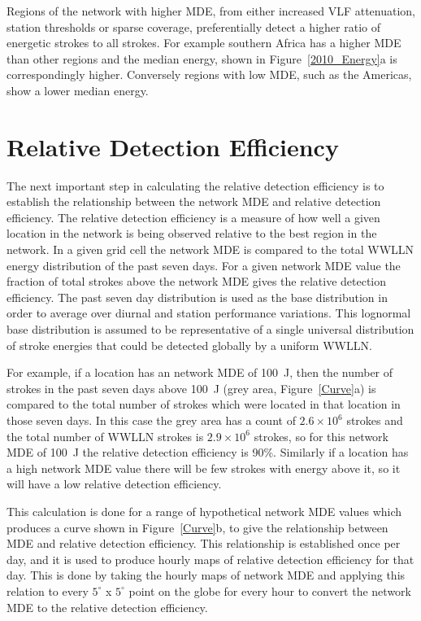 \documentclass[draft,ras]{agutex}
\begin{document}
\begin{article}
Regions of the network with higher MDE, from either increased VLF attenuation, station thresholds or sparse coverage, preferentially detect a higher ratio of energetic strokes to all strokes. For example southern Africa has a higher MDE than other regions and the median energy, shown in Figure~\ref{2010_Energy}a is correspondingly higher. Conversely regions with low MDE, such as the Americas, show a lower median energy.

\section{Relative Detection Efficiency}

The next important step in calculating the relative detection efficiency is to establish the relationship between the network MDE and relative detection efficiency. The relative detection efficiency is a measure of how well a given location in the network is being observed relative to the best region in the network. In a given grid cell the network MDE is compared to the total WWLLN energy distribution of the past seven days. For a given network MDE value the fraction of total strokes above the network MDE gives the relative detection efficiency. The past seven day distribution is used as the base distribution in order to average over diurnal and station performance variations. This lognormal base distribution is assumed to be representative of a single universal distribution of stroke energies that could be detected globally by a uniform WWLLN.

For example, if a location has an network MDE of 100~J, then the number of strokes in the past seven days above 100~J (grey area, Figure~\ref{Curve}a) is compared to the total number of strokes which were located in that location in those seven days. In this case the grey area has a count of $2.6\times10^6$ strokes and the total number of WWLLN strokes is $2.9\times10^6$ strokes, so for this network MDE of 100~J the relative detection efficiency is 90\%. Similarly if a location has a high network MDE value there will be few strokes with energy above it, so it will have a low relative detection efficiency.

This calculation is done for a range of hypothetical network MDE values which produces a curve shown in Figure~\ref{Curve}b, to give the relationship between MDE and relative detection efficiency. This relationship is established once per day, and it is used to produce hourly maps of relative detection efficiency for that day. This is done by taking the hourly maps of network MDE and applying this relation to every $5^\circ$ x $5^\circ$ point on the globe for every hour to convert the network MDE to the relative detection efficiency.


\end{article}
\end{document}
